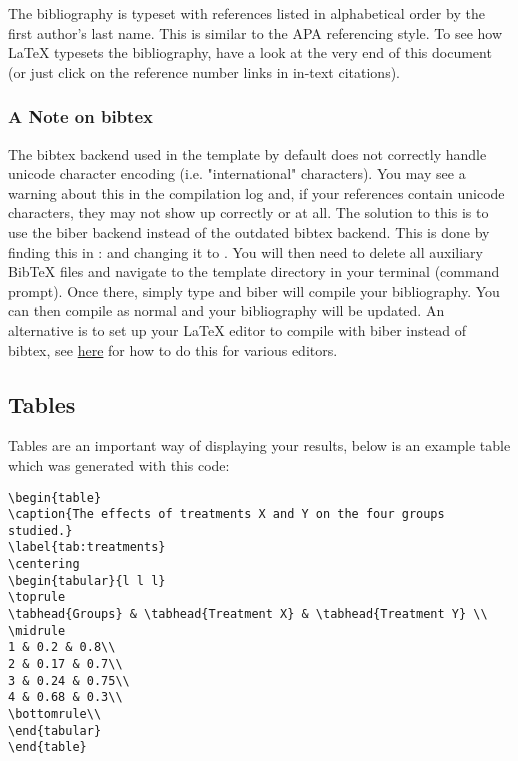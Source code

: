 The bibliography is typeset with references listed in alphabetical order by the first author's last name. This is similar to the APA referencing style. To see how \LaTeX{} typesets the bibliography, have a look at the very end of this document (or just click on the reference number links in in-text citations).

\subsubsection{A Note on bibtex}

The bibtex backend used in the template by default does not correctly handle unicode character encoding (i.e. "international" characters). You may see a warning about this in the compilation log and, if your references contain unicode characters, they may not show up correctly or at all. The solution to this is to use the biber backend instead of the outdated bibtex backend. This is done by finding this in :  and changing it to . You will then need to delete all auxiliary BibTeX files and navigate to the template directory in your terminal (command prompt). Once there, simply type  and biber will compile your bibliography. You can then compile  as normal and your bibliography will be updated. An alternative is to set up your LaTeX editor to compile with biber instead of bibtex, see \href{http://tex.stackexchange.com/questions/154751/biblatex-with-biber-configuring-my-editor-to-avoid-undefined-citations/}{here} for how to do this for various editors.

\subsection{Tables}

Tables are an important way of displaying your results, below is an example table which was generated with this code:

{\small
\begin{verbatim}
\begin{table}
\caption{The effects of treatments X and Y on the four groups studied.}
\label{tab:treatments}
\centering
\begin{tabular}{l l l}
\toprule
\tabhead{Groups} & \tabhead{Treatment X} & \tabhead{Treatment Y} \\
\midrule
1 & 0.2 & 0.8\\
2 & 0.17 & 0.7\\
3 & 0.24 & 0.75\\
4 & 0.68 & 0.3\\
\bottomrule\\
\end{tabular}
\end{table}
\end{verbatim}
}

